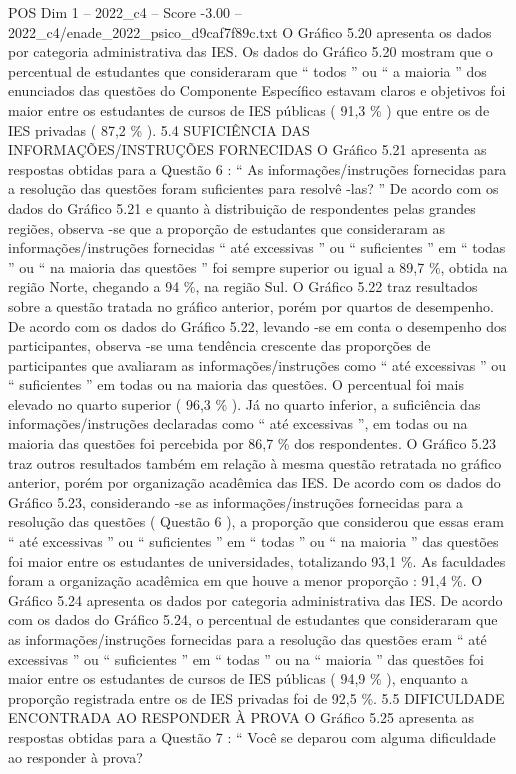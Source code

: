 \begin{textsample}{POS Dim 1 – 2022\_c4 – Score -3.00 – 2022\_c4/enade\_2022\_psico\_d9caf7f89c.txt}
O Gráfico 5.20 apresenta os dados por categoria administrativa das IES.
Os dados do Gráfico 5.20 mostram que o percentual de estudantes que consideraram que “ todos ” ou “ a maioria ” dos enunciados das questões do Componente Específico estavam claros e objetivos foi maior entre os estudantes de cursos de IES públicas ( 91,3 \% ) que entre os de IES privadas ( 87,2 \% ). 5.4 SUFICIÊNCIA DAS INFORMAÇÕES/INSTRUÇÕES FORNECIDAS O Gráfico 5.21 apresenta as respostas obtidas para a Questão 6 : “ As informações/instruções fornecidas para a resolução das questões foram suficientes para resolvê -las? ” De acordo com os dados do Gráfico 5.21 e quanto à distribuição de respondentes pelas grandes regiões, observa -se que a proporção de estudantes que consideraram as informações/instruções fornecidas “ até excessivas ” ou “ suficientes ” em “ todas ” ou “ na maioria das questões ” foi sempre superior ou igual a 89,7 \%, obtida na região Norte, chegando a 94 \%, na região Sul.
O Gráfico 5.22 traz resultados sobre a questão tratada no gráfico anterior, porém por quartos de desempenho.
De acordo com os dados do Gráfico 5.22, levando -se em conta o desempenho dos participantes, observa -se uma tendência crescente das proporções de participantes que avaliaram as informações/instruções como “ até excessivas ” ou “ suficientes ” em todas ou na maioria das questões.
O percentual foi mais elevado no quarto superior ( 96,3 \% ).
Já no quarto inferior, a suficiência das informações/instruções declaradas como “ até excessivas ”, em todas ou na maioria das questões foi percebida por 86,7 \% dos respondentes.
O Gráfico 5.23 traz outros resultados também em relação à mesma questão retratada no gráfico anterior, porém por organização acadêmica das IES.
De acordo com os dados do Gráfico 5.23, considerando -se as informações/instruções fornecidas para a resolução das questões ( Questão 6 ), a proporção que considerou que essas eram “ até excessivas ” ou “ suficientes ” em “ todas ” ou “ na maioria ” das questões foi maior entre os estudantes de universidades, totalizando 93,1 \%.
As faculdades foram a organização acadêmica em que houve a menor proporção : 91,4 \%.
O Gráfico 5.24 apresenta os dados por categoria administrativa das IES.
De acordo com os dados do Gráfico 5.24, o percentual de estudantes que consideraram que as informações/instruções fornecidas para a resolução das questões eram “ até excessivas ” ou “ suficientes ” em “ todas ” ou na “ maioria ” das questões foi maior entre os estudantes de cursos de IES públicas ( 94,9 \% ), enquanto a proporção registrada entre os de IES privadas foi de 92,5 \%. 5.5 DIFICULDADE ENCONTRADA AO RESPONDER À PROVA O Gráfico 5.25 apresenta as respostas obtidas para a Questão 7 : “ Você se deparou com alguma dificuldade ao responder à prova?

\end{textsample}
